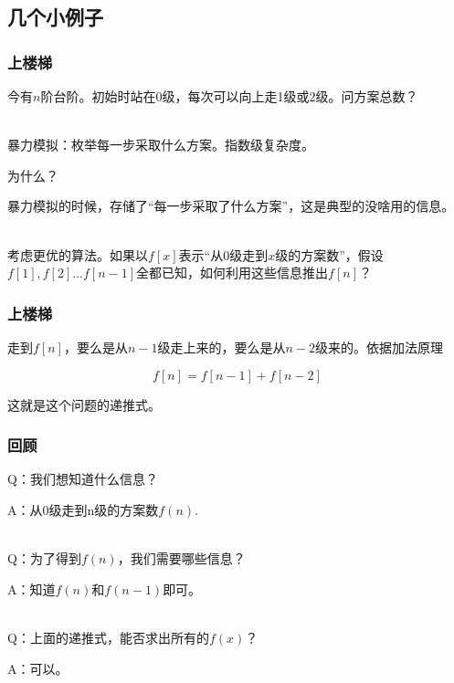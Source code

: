 \documentclass{beamer}
\begin{document}
\subsection{几个小例子}

\begin{frame}
    \frametitle{上楼梯}

    今有$n$阶台阶。初始时站在0级，每次可以向上走1级或2级。问方案总数？
    \pause
    
    ~\\

    暴力模拟：枚举每一步采取什么方案。指数级复杂度。

    \pause

    为什么？

    \pause

    暴力模拟的时候，存储了“每一步采取了什么方案”，这是典型的没啥用的信息。

    \pause

    ~\\


    考虑更优的算法。如果以$f[x]$表示“从0级走到$x$级的方案数”，假设$f[1], f[2]... f[n-1]$全都已知，如何利用这些信息推出$f[n]$？

\end{frame}

\begin{frame}
    \frametitle{上楼梯}

    走到$f[n]$，要么是从$n-1$级走上来的，要么是从$n-2$级来的。依据加法原理

    \[f[n] = f[n-1] + f[n-2]\]

    这就是这个问题的递推式。

\end{frame}

\begin{frame}
    \frametitle{回顾}

    Q：我们想知道什么信息？

    A：从0级走到n级的方案数$f(n)$.

    ~\\

    Q：为了得到$f(n)$，我们需要哪些信息？
    
    A：知道$f(n)$和$f(n-1)$即可。

    ~\\

    Q：上面的递推式，能否求出所有的$f(x)$？

    A：可以。

\end{frame}
\end{document}
